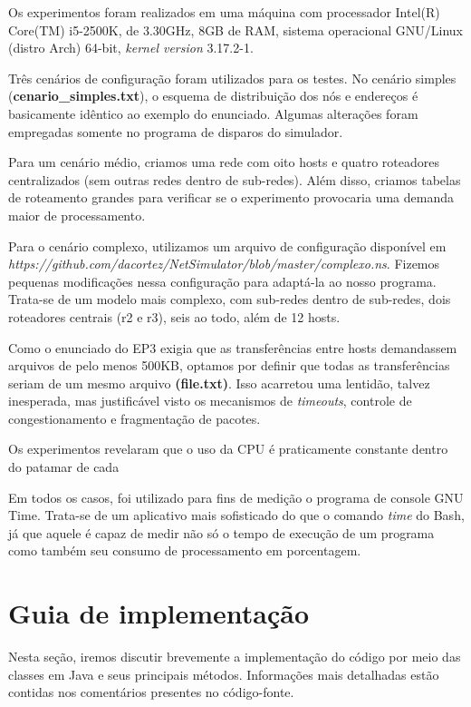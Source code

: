 \documentclass[11pt]{article}
\begin{document}
Os experimentos foram realizados em uma máquina com processador Intel(R) Core(TM) i5-2500K, de 3.30GHz, 8GB de RAM, sistema operacional GNU/Linux (distro Arch) 64-bit, \textit{kernel version} 3.17.2-1.

Três cenários de configuração foram utilizados para os testes. No cenário simples (\textbf{cenario\_simples.txt}), o esquema de distribuição dos nós e endereços é basicamente idêntico ao exemplo do enunciado. Algumas alterações foram empregadas somente no programa de disparos do simulador.

Para um cenário médio, criamos uma rede com oito hosts e quatro roteadores centralizados (sem outras redes dentro de sub-redes). Além disso, criamos tabelas de roteamento grandes para verificar se o experimento provocaria uma demanda maior de processamento.

Para o cenário complexo, utilizamos um arquivo de configuração disponível em \textit{https://github.com/dacortez/NetSimulator/blob/master/complexo.ns}. Fizemos pequenas modificações nessa configuração para adaptá-la ao nosso programa. Trata-se de um modelo mais complexo, com sub-redes dentro de sub-redes, dois roteadores centrais (r2 e r3), seis ao todo, além de 12 hosts.

Como o enunciado do EP3 exigia que as transferências entre hosts demandassem arquivos de pelo menos 500KB, optamos por definir que todas as transferências seriam de um mesmo arquivo \textbf{(file.txt)}. Isso acarretou uma lentidão, talvez inesperada, mas justificável visto os mecanismos de \textit{timeouts}, controle de congestionamento e fragmentação de pacotes.

Os experimentos revelaram que o uso da CPU é praticamente constante dentro do patamar de cada 

Em todos os casos, foi utilizado para fins de medição o programa de console GNU Time. Trata-se de um aplicativo mais sofisticado do que o comando \textit{time} do Bash, já que aquele é capaz de medir não só o tempo de execução de um programa como também seu consumo de processamento em porcentagem.


\section{Guia de implementação}

Nesta seção, iremos discutir brevemente a implementação do código por meio das classes em Java e seus principais métodos. Informações mais detalhadas estão contidas nos comentários presentes no código-fonte.
\end{document}
